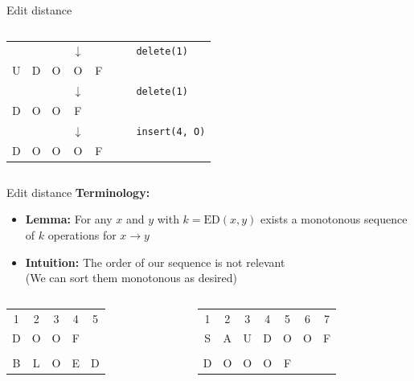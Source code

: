 \begin{frame}{Edit distance}
\begin{columns}
\begin{column}{0.5\linewidth}
\begin{center}
\begin{tabular}{c@{}c@{}c@{}c@{}c@{}c@{}cl}
          {} & {} & {} & $\downarrow$ & {} & {} & {} &
          \texttt{delete({\color{Mittel-Blau}1})}\\
          U & D & O & O & F\\
          {} & {} & {} & $\downarrow$ & {} & {} & {} &
          \texttt{delete({\color{Mittel-Blau}1})}\\
          D & O & O & F\\
          {} & {} & {} & $\downarrow$ & {} & {} & {} &
          \texttt{insert({\color{Mittel-Blau}4}, O)}\\
          D & O & O & O & F
        \end{tabular}
      \end{center}
    \end{column}
  \end{columns}
\end{frame}


\begin{frame}{Edit distance}
  \textbf{Terminology:}
  \begin{itemize}
    \item<2->
      \textbf{Lemma:}
      For any {\color{Mittel-Blau}$x$} and {\color{Mittel-Blau}$y$}
      with $k = \mathrm{ED}(x, y)$ exists a {\color{Mittel-Blau}monotonous}
      sequence of $k$ operations for {\color{Mittel-Blau}$x \rightarrow y$}
    \item<3->
      \textbf{Intuition:}
      The order of our sequence is not relevant\\
      (We can sort them monotonous as desired)
  \end{itemize}
  \begin{columns}[T]
    \begin{column}{0.5\linewidth}
      \begin{center}
        \begin{tabular}{ccccc}
          1 & 2 & 3 & 4 & 5\\
          D & O & O & F\\
          \\
          B & L & O & E & D
        \end{tabular}
      \end{center}
    \end{column}
    \begin{column}{0.5\linewidth}
      \begin{center}
        \begin{tabular}{ccccccc}
          1 & 2 & 3 & 4 & 5 & 6 & 7\\
          S & A & U & D & O & O & F\\
          \\
          D & O & O & O & F
        \end{tabular}
      \end{center}
    \end{column}
  \end{columns}
\end{frame}

